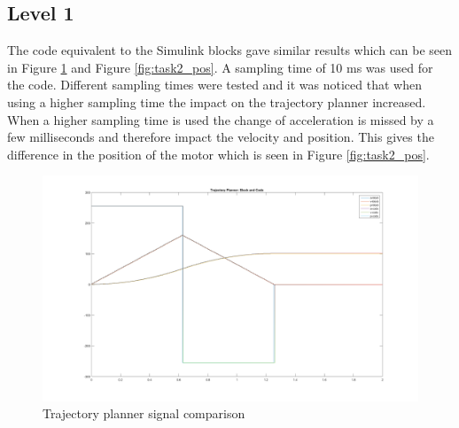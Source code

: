 %
%


%

\subsection*{Level 1}
The code equivalent to the Simulink blocks gave similar results which can be seen in Figure \ref{fig:task2_traj} and Figure \ref{fig:task2_pos}. A sampling time of 10 ms was used for the code. Different sampling times were tested and it was noticed that when using a higher sampling time the impact on the trajectory planner increased. When a higher sampling time is used the change of acceleration is missed by a few milliseconds and therefore impact the velocity and position. This gives the difference in the position of the motor which is seen in Figure \ref{fig:task2_pos}.
\begin{figure}[H]
	\begin{center}
	
		\includegraphics[width=\linewidth]{task2_traj.png}
		\caption{Trajectory planner signal comparison}
		\label{fig:task2_traj}
	\end{center}
\end{figure}



